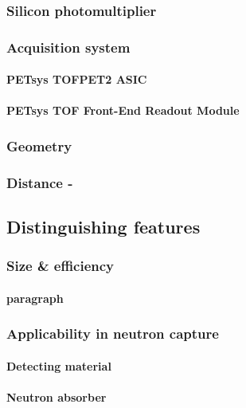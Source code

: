 \subsubsection{Silicon photomultiplier}

\subsubsection{Acquisition system}

\paragraph*{PETsys TOFPET2 ASIC}

\paragraph*{PETsys TOF Front-End Readout Module}

\subsubsection{Geometry}

\subsubsection{Distance - }


\subsection{Distinguishing features}

\subsubsection{Size \& efficiency}

\paragraph{paragraph}

\subsubsection{Applicability in neutron capture}

\paragraph{Detecting material}

\paragraph{Neutron absorber}